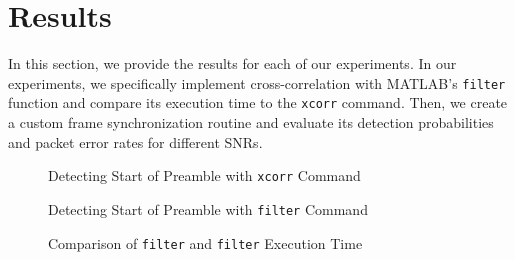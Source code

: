 \documentclass{article}
\begin{document}
\section{Results}

In this section, we provide the results for each of our experiments. In our experiments, we specifically implement cross-correlation with MATLAB's \texttt{filter} function and compare its execution time to the \texttt{xcorr} command. Then, we create a custom frame synchronization routine and evaluate its detection probabilities and packet error rates for different SNRs.

\begin{figure}[H]
	\centerline{}
	\caption{Detecting Start of Preamble with \texttt{xcorr} Command}
	\label{fig::xcorr_preamble_detect}
\end{figure}

\begin{figure}[H]
	\centerline{}
	\caption{Detecting Start of Preamble with \texttt{filter} Command}
	\label{fig::filter_preamble_detect}
\end{figure}

\begin{figure}[H]
	\centerline{}
	\caption{Comparison of \texttt{filter} and \texttt{filter} Execution Time}
	\label{fig::execution_time}
\end{figure}
\end{document}
